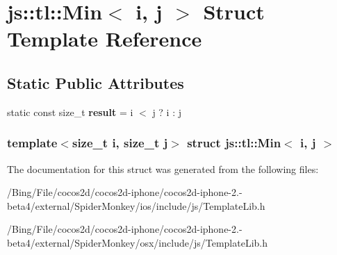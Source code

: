 \hypertarget{structjs_1_1tl_1_1_min}{\section{js\-:\-:tl\-:\-:Min$<$ i, j $>$ Struct Template Reference}
\label{structjs_1_1tl_1_1_min}
}
\subsection*{Static Public Attributes}
\begin{DoxyCompactItemize}
\item 
\hypertarget{structjs_1_1tl_1_1_min_aa6984be22d5ebcdc31a231734ae4dc78}{static const size\-\_\-t {\bfseries result} = i $<$ j ? i \-: j}\label{structjs_1_1tl_1_1_min_aa6984be22d5ebcdc31a231734ae4dc78}

\end{DoxyCompactItemize}
\subsubsection*{template$<$size\-\_\-t i, size\-\_\-t j$>$ struct js\-::tl\-::\-Min$<$ i, j $>$}



The documentation for this struct was generated from the following files\-:\begin{DoxyCompactItemize}
\item 
/\-Bing/\-File/cocos2d/cocos2d-\/iphone/cocos2d-\/iphone-\/2.-\/beta4/external/\-Spider\-Monkey/ios/include/js/Template\-Lib.\-h\item 
/\-Bing/\-File/cocos2d/cocos2d-\/iphone/cocos2d-\/iphone-\/2.-\/beta4/external/\-Spider\-Monkey/osx/include/js/Template\-Lib.\-h\end{DoxyCompactItemize}
